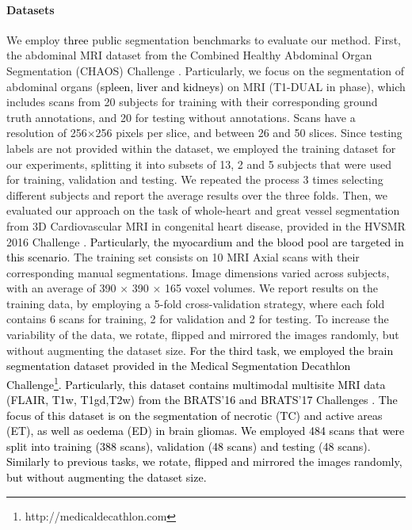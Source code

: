 \documentclass[journal]{IEEEtran}
\begin{document}
\paragraph*{\textbf{Datasets}}We employ \textcolor{black}{three} public segmentation benchmarks to evaluate our method. First, the abdominal MRI dataset from the Combined Healthy Abdominal Organ Segmentation (CHAOS) Challenge \cite{selver2014exploring,selvi2015segmentation,selver2014segmentation}. Particularly, we focus on the segmentation of abdominal organs \textcolor{black}{(spleen, liver and kidneys)} on MRI (T1-DUAL in phase), which includes scans from 20 subjects for training with their corresponding ground truth annotations, and 20 for testing without annotations. Scans have a resolution of 256$\times$256 pixels per slice, and between 26 and 50 slices. Since testing labels are not provided within the dataset, we employed the training dataset for our experiments, splitting it into subsets of 13, 2 and 5 subjects that were used for training, validation and testing. We repeated the process 3 times selecting different subjects and report the average results over the three folds. Then, we evaluated our approach on the task of whole-heart and great vessel segmentation from 3D Cardiovascular MRI in congenital heart disease, provided in the HVSMR 2016 Challenge \cite{pace2015interactive}. \textcolor{black}{Particularly, the myocardium and the blood pool are targeted in this scenario}. The training set consists on 10 MRI Axial scans with their corresponding manual segmentations. Image dimensions varied across subjects, with an average of 390 $\times$ 390 $\times$ 165 voxel volumes. We report results on the training data, by employing a 5-fold cross-validation strategy, where each fold contains 6 scans for training, 2 for validation and 2 for testing. To increase the variability of the data, we rotate, flipped and mirrored the images randomly, but without augmenting the dataset size. \textcolor{black}{For the third task, we employed the brain segmentation dataset provided in the Medical Segmentation Decathlon Challenge\footnote{http://medicaldecathlon.com}. Particularly, this dataset contains multimodal multisite MRI data (FLAIR, T1w, T1gd,T2w) from the BRATS'16 and BRATS'17 Challenges \cite{menze2014multimodal,bakas2017advancing,bakas2018identifying}. The focus of this dataset is on the segmentation of necrotic (TC) and active areas (ET), as well as oedema (ED) in brain gliomas. We employed 484 scans that were split into training (388 scans), validation (48 scans) and testing (48 scans). Similarly to previous tasks, we rotate, flipped and mirrored the images randomly, but without augmenting the dataset size.}
\end{document}
